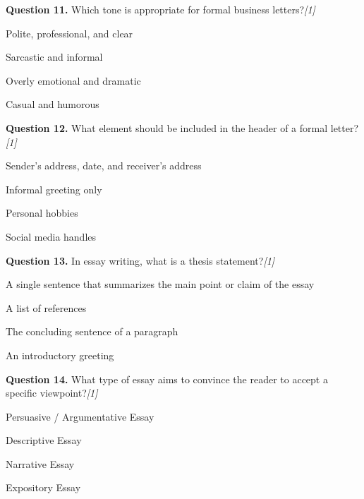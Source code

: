 \documentclass[11pt,a4paper]{article}
\newcommand{\pts}[1]{\hfill   \textit{[#1]}}
\begin{document}
\medskip




\noindent   \textbf{Question 11.} Which tone is appropriate for formal business letters?\pts{1}

\begin{parts}
  \item Polite, professional, and clear
  \item Sarcastic and informal
  \item Overly emotional and dramatic
  \item Casual and humorous
\end{parts}

\medskip




\noindent   \textbf{Question 12.} What element should be included in the header of a formal letter?\pts{1}

\begin{parts}
  \item Sender's address, date, and receiver's address
  \item Informal greeting only
  \item Personal hobbies
  \item Social media handles
\end{parts}

\medskip




\noindent   \textbf{Question 13.} In essay writing, what is a thesis statement?\pts{1}

\begin{parts}
  \item A single sentence that summarizes the main point or claim of the essay
  \item A list of references
  \item The concluding sentence of a paragraph
  \item An introductory greeting
\end{parts}

\medskip




\noindent   \textbf{Question 14.} What type of essay aims to convince the reader to accept a specific viewpoint?\pts{1}

\begin{parts}
  \item Persuasive / Argumentative Essay
  \item Descriptive Essay
  \item Narrative Essay
  \item Expository Essay
\end{parts}
\end{document}
